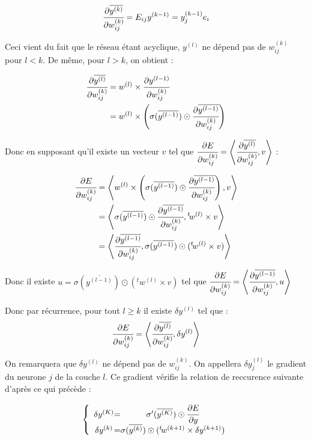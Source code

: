 \[\cfrac{\partial \overline{y^{(k)}}}{\partial w_{ij}^{(k)}} = E_{ij} y^{(k-1)} = y^{(k-1)}_j e_i\]

Ceci vient du fait que le réseau étant acyclique, $ y^{(l)}$ ne dépend pas de
$w_{ij}^{(k)}$ pour $l < k$. De même, pour $l > k$, on obtient :

\begin{align*}
\cfrac{\partial \overline{y^{(l)}}}{\partial w_{ij}^{(k)}} &= w^{(l)} \times \cfrac{\partial y^{(l-1)}}{\partial w_{ij}^{(k)}}\\
&= w^{(l)} \times \left(\sigma(\overline{y^{(l-1)}}) \odot \cfrac{\partial \overline{y^{(l-1)}}}{\partial w_{ij}^{(k)}}\right)
\end{align*}

Donc en supposant qu'il existe un vecteur $v$ tel que $\cfrac{\partial E}{\partial w_{ij}^{(k)}} = \left\langle\cfrac{\partial \overline{y^{(l)}}}{\partial w_{ij}^{(k)}} ,v\right\rangle$ :

\begin{align*}
\cfrac{\partial E}{\partial w_{ij}^{(k)}} &= \left\langle w^{(l)} \times \left(\sigma(\overline{y^{(l-1)}}) \odot \cfrac{\partial \overline{y^{(l-1)}}}{\partial w_{ij}^{(k)}}\right) ,v\right\rangle\\
&= \left\langle\sigma(\overline{y^{(l-1)}}) \odot \cfrac{\partial \overline{y^{(l-1)}}}{\partial w_{ij}^{(k)}},{}^t \! w^{(l)} \times v\right\rangle\\
&= \left\langle\cfrac{\partial \overline{y^{(l-1)}}}{\partial w_{ij}^{(k)}},\sigma(\overline{y^{(l-1)}}) \odot ({}^t \! w^{(l)} \times v)\right\rangle\\
\end{align*}

Donc il existe $u = \sigma(\overline{y^{(l-1)}}) \odot ({}^t \! w^{(l)} \times v)$
tel que $\cfrac{\partial E}{\partial w_{ij}^{(k)}} = \left\langle\cfrac{\partial \overline{y^{(l-1)}}}{\partial w_{ij}^{(k)}} ,u\right\rangle$

Donc par récurrence, pour tout $l \geq k$ il existe $\delta y^{(l)}$ tel que :
\[\cfrac{\partial E}{\partial w_{ij}^{(k)}} = \left\langle\cfrac{\partial \overline{y^{(l)}}}{\partial w_{ij}^{(k)}} ,\delta y^{(l)}\right\rangle\]

On remarquera que $\delta y^{(l)}$ ne dépend pas de $w_{ij}^{(k)}$. On appellera
 $\delta y^{(l)}_j$ le gradient du neurone $j$ de la couche $l$. Ce gradient vérifie la relation de reccurence suivante d'après ce qui précède :

\[
\left \{
\begin{array}{c @{=} c}
    \delta y^{(K)} & \sigma'(\overline{y^{(K)}}) \odot \cfrac{\partial E}{\partial y}\\
    \delta y^{(k)} & \sigma(\overline{y^{(k)}}) \odot ({}^t \! w^{(k+1)} \times \delta y^{(k+1)})\\
\end{array}
\right.
\]

